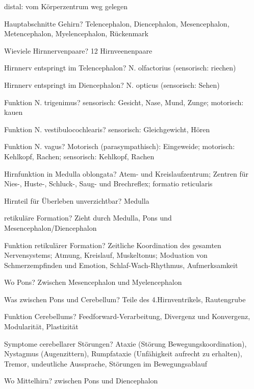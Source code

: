 \documentclass[a4paper]{article}
\begin{document}
\begin{multicols}{3}
  distal: vom Körperzentrum weg gelegen

  Hauptabschnitte Gehirn? Telencephalon, Diencephalon, Mesencephalon, Metencephalon, Myelencephalon, Rückenmark

  Wieviele Hirnnervenpaare? 12 Hirnveenenpaare

  Hirnnerv entspringt im Telencephalon? N. olfactorius (sensorisch: riechen)

  Hirnnerv entspringt im Diencephalon? N. opticus (sensorisch: Sehen)

  Funktion N. trigenimus? sensorisch: Gesicht, Nase, Mund, Zunge; motorisch: kauen

  Funktion N. vestibulocochlearis? sensorisch: Gleichgewicht, Hören

  Funktion N. vagus? Motorisch (parasympathisch): Eingeweide; motorisch: Kehlkopf, Rachen; sensorisch: Kehlkopf, Rachen

  Hirnfunktion in Medulla oblongata? Atem- und Kreislaufzentrum; Zentren für Nies-, Huste-, Schluck-, Saug- und Brechreflex; formatio reticularis

  Hirnteil für Überleben unverzichtbar? Medulla

  retikuläre Formation? Zieht durch Medulla, Pons und Mesencephalon/Diencephalon

  Funktion retikulärer Formation? Zeitliche Koordination des gesamten Nervensystems; Atmung, Kreislauf, Muskeltonus; Moduation von Schmerzempfinden und Emotion, Schlaf-Wach-Rhythmus, Aufmerksamkeit

  Wo Pons? Zwischen Mesencephalon und Myelencephalon%

  Was zwischen Pons und Cerebellum? Teile des 4.Hirnventrikels, Rautengrube



  Funktion Cerebellums? Feedforward-Verarbeitung, Divergenz und Konvergenz, Modularität, Plastizität

  Symptome cerebellarer Störungen? Ataxie (Störung Bewegungskoordination), Nystagmus (Augenzittern), Rumpfataxie (Unfähigkeit aufrecht zu erhalten), Tremor, undeutliche Aussprache, Störungen im Bewegungsablauf

  Wo Mittelhirn? zwischen Pons und Diencephalon


\end{multicols}
\end{document}

